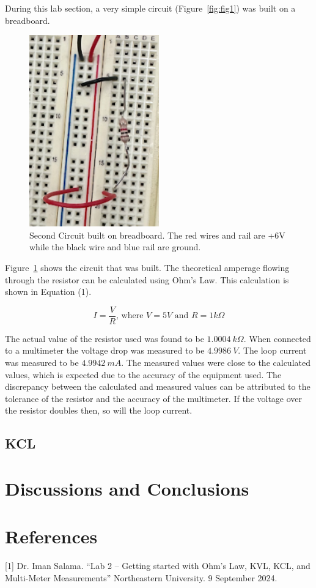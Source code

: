 \documentclass{article}
\begin{document}
During this lab section, a very simple circuit (Figure~\ref{fig:fig1}) was built on a 
breadboard.  

\begin{figure}[H]
    \centering
    \includegraphics[angle=90,origin=c,width=0.5\textwidth]{built_figure1.png}
    \caption{Second Circuit built on breadboard. The red wires and rail are +6V while the black wire and blue rail are ground.}
    \label{fig:fig2}
\end{figure}

Figure~\ref{fig:fig2} shows the circuit that was built.
The theoretical amperage flowing through the resistor can be calculated
using Ohm's Law. This calculation is shown in Equation (1).

\begin{equation}
    I = \frac{V}{R}
    \text{, where } V = 5V \text{ and } R = 1k\Omega
\end{equation}

The actual value of the resistor used was found to be $1.0004 \: k\Omega$. When 
connected to a multimeter the voltage drop was measured to be $4.9986 \: V$.
The loop current was measured to be $4.9942 \: mA$. The measured values were close to the
calculated values, which is expected due to the accuracy of the equipment used.
The discrepancy between the calculated and measured values can be attributed to the
tolerance of the resistor and the accuracy of the multimeter. If the voltage over the
resistor doubles then, so will the loop current.

\subsection{KCL}


\section{Discussions and Conclusions}


\section{References}
[1] Dr. Iman Salama. “Lab 2 – Getting started with Ohm’s Law, KVL, KCL, 
and Multi-Meter Measurements” Northeastern University. 9 September 2024.
\end{document}
